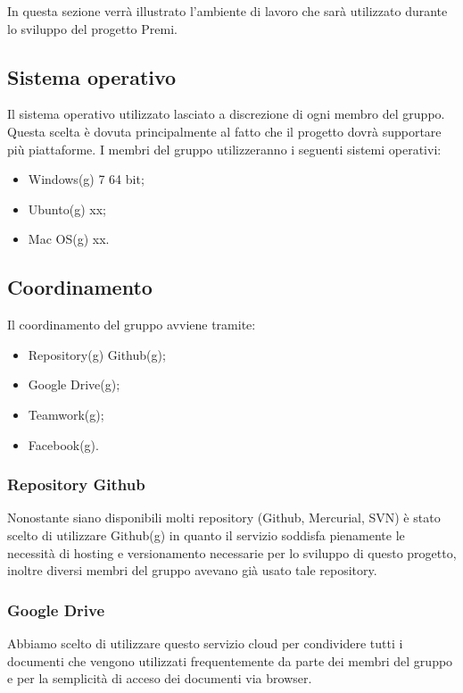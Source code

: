 In questa sezione verrà illustrato l'ambiente di lavoro che sarà utilizzato durante lo sviluppo del progetto Premi.\\

\subsection{Sistema operativo}

Il sistema operativo utilizzato lasciato a discrezione di ogni membro del gruppo. Questa scelta è dovuta principalmente al fatto che il progetto dovrà supportare più piattaforme.
I membri del gruppo utilizzeranno i seguenti sistemi operativi:

\begin{itemize}
	\item Windows(g) 7 64 bit;
	\item Ubunto(g) xx;
	\item Mac OS(g) xx.
\end{itemize}

\subsection{Coordinamento}

Il coordinamento del gruppo avviene tramite:
\begin{itemize}
	\item Repository(g) Github(g);
	\item Google Drive(g);
	\item Teamwork(g);
	\item Facebook(g).
\end{itemize}

\subsubsection{Repository Github}

Nonostante siano disponibili molti repository (Github, Mercurial, SVN) è stato scelto di utilizzare Github(g) in quanto il servizio soddisfa pienamente le necessità di hosting e versionamento necessarie per lo sviluppo di questo progetto, inoltre diversi membri del gruppo avevano già usato tale repository.

\subsubsection{Google Drive}

Abbiamo scelto di utilizzare questo servizio cloud per condividere tutti i documenti che vengono utilizzati frequentemente da parte dei membri del gruppo e per la semplicità di acceso dei documenti via browser.

